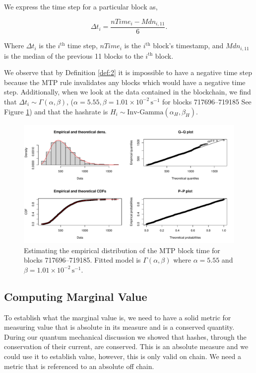 \documentclass[runningheads]{llncs}
\begin{document}
We express the time step for a particular block as,
\begin{definition} \label{def:2}
    \begin{equation}
        \Delta t_i = \frac{nTime_i - Mdn_{i,11}}{6}.
    \end{equation}
\end{definition}
Where $\Delta t_i$ is the $i^{\mbox{th}}$ time step, $nTime_i$ is the $i^{\mbox{th}}$ block's timestamp, and $Mdn_{i,11}$ is the median of the previous 11 blocks to the $i^{\mbox{th}}$ block.

We observe that by Definition \ref{def:2} it is impossible to have a negative time step because the MTP rule invalidates any blocks which would have a negative time step.
Additionally, when we look at the data contained in the blockchain, we find that $\Delta t_i \sim \Gamma(\alpha, \beta)$, ($\alpha = 5.55, \beta = 1.01\times 10^{-2}\,\textrm{s}^{-1}$ for blocks 717696--719185 See Figure \ref{fig:4}) and that the hashrate is $H_i \sim \mbox{Inv-Gamma}(\alpha_H, \beta_H)$.
\begin{figure}
    \includegraphics[width=\textwidth]{BTC MTP Emperical Distribution Fit.pdf}
    \caption{
        Estimating the empirical distribution of the MTP block time for blocks 717696--719185.
        Fitted model is $\Gamma(\alpha,\beta)$ where $\alpha = 5.55$ and $\beta = 1.01\times 10^{-2}\,\textrm{s}^{-1}$.
    }\label{fig:4}
\end{figure}

\subsection{Computing Marginal Value}\label{sect:3.2}
To establish what the marginal value is, we need to have a solid metric for measuring value that is absolute in its measure and is a conserved quantity.
During our quantum mechanical discussion we showed that hashes, through the conservation of their current, are conserved.
This is an absolute measure and we could use it to establish value, however, this is only valid on chain.
We need a metric that is referenced to an absolute off chain.
\end{document}
